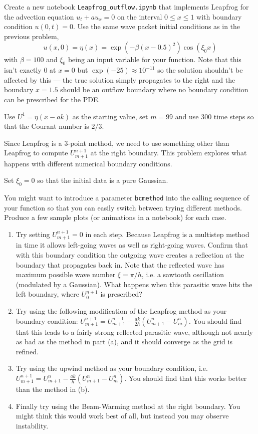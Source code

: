 \documentclass[10pt]{article}
\begin{document}
Create a new notebook \verb+Leapfrog_outflow.ipynb+ that 
implements Leapfrog for the advection equation $u_t + au_x=0$ on the
interval $0\leq x\leq 1$ with boundary condition $u(0,t) = 0$.
Use the same wave packet initial conditions as in the previous problem,
\[
u(x,0) = \eta(x) = \exp(-\beta(x-0.5)^2) \cos(\xi_0 x)
\]
with $\beta = 100$ and $\xi_0$ being an input variable for your function.
Note that this isn't exactly 0 at $x=0$ but $\exp(-25)\approx 10^{-11}$ so
the solution shouldn't be affected by this --- the true solution simply
propagates to the right and the boundary $x=1.5$ should be an outflow
boundary where no boundary condition can be prescribed for the PDE.  

Use $U^1= \eta(x - ak)$ as the starting value, set $m=99$ and use 300 time
steps so that the Courant number is $2/3$.

Since Leapfrog is a 3-point method, we need to use something other than
Leapfrog to compute $U_{m+1}^{n+1}$ at the right boundary.  
This problem explores what happens with different numerical boundary conditions.

Set $\xi_0 =0$ so that the initial data is a pure Gaussian.

You might want to introduce a parameter \verb+bcmethod+ into the calling
sequence of your function so that you can easily switch between trying
different methods.   Produce a few sample plots (or animations in a
notebook) for each case.

\begin{enumerate} 
\item Try setting $U_{m+1}^{n+1}= 0$ in each step.  Because Leapfrog is a
multistep method in time it allows left-going waves as well as right-going
waves.  Confirm that with this boundary condition the outgoing wave creates
a reflection at the boundary that propagates back in.  Note that the
reflected wave has maximum possible wave number $\xi = \pi/h$, i.e. a
sawtooth oscillation (modulated by a Gaussian). What happens when this
parasitic wave hits the left boundary, where $U_0^{n+1}$ is prescribed?

\item Try using the following modification of the Leapfrog method as
your boundary condition:
$U_{m+1}^{n+1} = U_{m+1}^{n-1} - \frac{ak}{2h}(U_{m+1}^n - U_m^n)$.
You should find that this leads to a fairly strong reflected parasitic wave,
although not nearly as bad as the method in part (a), and it should converge
as the grid is refined.

\item Try using the upwind method as your boundary condition,
i.e. $U_{m+1}^{n+1} = U_{m+1}^{n} - \frac{ak}{h}(U_{m+1}^n - U_m^n)$.
You should find that this works better than the method in (b).

\item Finally try using the Beam-Warming method at the right boundary.
You might think this would work best of all, but instead you may observe
instability.

\end{enumerate} 
\end{document}
